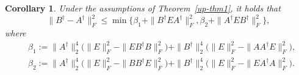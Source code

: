 \documentclass[11pt]{article}
\newtheorem{corollary}{Corollary}[section]
\begin{document}
\begin{corollary}\label{corup1}
Under the assumptions of Theorem~\ref{up-thm1}, it holds that
\begin{equation}\label{corup1.1}
\|B^{\dagger}-A^{\dagger}\|_{F}^{2}\leq\min\big\{\beta_{1}+\|B^{\dagger}EA^{\dagger}\|_{F}^{2},\beta_{2}+\|A^{\dagger}EB^{\dagger}\|_{F}^{2}\big\},
\end{equation}
where
\begin{align*}
&\beta_{1}:=\|A^{\dagger}\|_{2}^{4}\big(\|E\|_{F}^{2}-\|EB^{\dagger}B\|_{F}^{2}\big)+\|B^{\dagger}\|_{2}^{4}\big(\|E\|_{F}^{2}-\|AA^{\dagger}E\|_{F}^{2}\big),\\
&\beta_{2}:=\|A^{\dagger}\|_{2}^{4}\big(\|E\|_{F}^{2}-\|BB^{\dagger}E\|_{F}^{2}\big)+\|B^{\dagger}\|_{2}^{4}\big(\|E\|_{F}^{2}-\|EA^{\dagger}A\|_{F}^{2}\big).
\end{align*}
\end{corollary}
\end{document}
